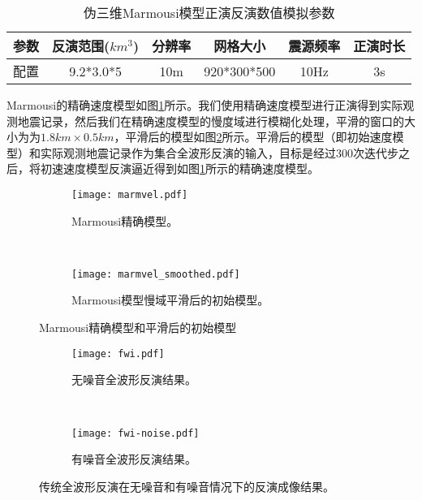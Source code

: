 \begin{table}[ht]
\centering
\caption{伪三维Marmousi模型正演反演数值模拟参数}
\label{tb:伪三维Marmousi模型正演反演数值模拟参数}
\begin{tabular}{cccccc}
\hline
参数 & 反演范围($km^3$) & 分辨率 & 网格大小        & 震源频率 & 正演时长 \\\hline
配置 & 9.2*3.0*5     & 10m   & 920*300*500   & 10Hz    & 3s  \\\hline
\end{tabular}
\end{table}

Marmousi的精确速度模型如图\ref{fig:Marmousi精确模型}所示。我们使用精确速度模型进行正演得到实际观测地震记录，然后我们在精确速度模型的慢度域进行模糊化处理，平滑的窗口的大小为为$1.8km\times 0.5km$，平滑后的模型如图\ref{fig:Marmousi模型慢域平滑后的初始模型}所示。平滑后的模型（即初始速度模型）和实际观测地震记录作为集合全波形反演的输入，目标是经过300次迭代步之后，将初速速度模型反演逼近得到如图\ref{fig:Marmousi精确模型}所示的精确速度模型。

\begin{figure}[ht]
    \centering
    \begin{subfigure}[b]{0.5\textwidth}
        \centering
        \texttt{[image: marmvel.pdf]}
        \caption{Marmousi精确模型。}
        \label{fig:Marmousi精确模型}
    \end{subfigure}%
    ~
    \begin{subfigure}[b]{0.5\textwidth}
        \centering
        \texttt{[image: marmvel\_smoothed.pdf]}
        \caption{Marmousi模型慢域平滑后的初始模型。}
        \label{fig:Marmousi模型慢域平滑后的初始模型}
    \end{subfigure}
    \caption{Marmousi精确模型和平滑后的初始模型}
    \label{fig:Marmousi精确模型和平滑后的初始模型}
\end{figure}


\begin{figure}[ht]
    \centering
    \begin{subfigure}[b]{0.5\textwidth}
        \centering
        \texttt{[image: fwi.pdf]}
        \caption{无噪音全波形反演结果。}
        \label{fig:无噪音全波形反演结果}
    \end{subfigure}%
    ~
    \begin{subfigure}[b]{0.5\textwidth}
        \centering
        \texttt{[image: fwi-noise.pdf]}
        \caption{有噪音全波形反演结果。}
        \label{fig:有噪音全波形反演结果}
    \end{subfigure}
    \caption{传统全波形反演在无噪音和有噪音情况下的反演成像结果。}
\end{figure}


